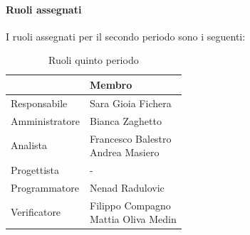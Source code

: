 \documentclass[a4paper,12pt]{article}
\begin{document}
            \paragraph{Ruoli assegnati}
            I ruoli assegnati per il secondo periodo sono i seguenti:
                \begin{table}[H]
                \centering
                \begin{tabular}{|l|l|}
                \hline
                    \rowcolor{lightgray}{\textbf{Ruolo}} & {\textbf{Membro}} \\
                \hline
                    Responsabile & Sara Gioia Fichera \\
                \hline
                    Amministratore & Bianca Zaghetto \\
                \hline
                    Analista & \makecell[l]{Francesco Balestro \\ Andrea Masiero} \\
                \hline
                    Progettista & - \\
                \hline
                    Programmatore & Nenad Radulovic \\
                \hline
                    Verificatore & \makecell[l]{Filippo Compagno \\ Mattia Oliva Medin} \\
                \hline
                \end{tabular}
                \caption{Ruoli quinto periodo}
                \end{table}
                
\end{document}
